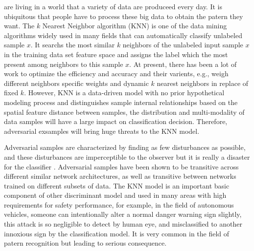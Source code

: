 \documentclass{ieeeaccess}
\begin{document}
\label{sec:introduction}
 are living in a world that a variety of data are produceed every day. It is ubiquitous that people have to process these big data to obtain the patern they want.
The $k$ Nearest Neighbor algorithm (KNN) is one of the data mining algorithms widely used in many fields that can automatically classify unlabeled sample $x$. It searchs the most similar $k$ neighbors of the unlabeled input sample $x$ in the training data set feature space and assigns the label which the most present among  neighbors to this sample $x$\cite{cover1967nearest}. 
At present, there has been a lot of work to optimize the efficiency and accuracy and their varients, e.g., weigh different neighbors specific weights\cite{bicego2016weighted} and dynamic $k$ nearest neighbors in replace of fixed $k$\cite{Zhong:2017:IKC:3055635.3056604}.
However, KNN is a data-driven model with no prior hypothetical modeling process and distinguishes sample internal relationships based on the spatial feature distance between samples, the distribution and multi-modality of data samples will have a large impact on classification decision. Therefore, adversarial exsamples will bring huge threats to the KNN model.

Adversarial samples are characterized by finding as few disturbances as possible, and these disturbances are imperceptible to the observer but it is really a disaster for the classifier \cite{goodfellow2014explaining}. Adversarial samples have been shown to be transitive across different similar network architectures, as well as transitive between networks trained on different subsets of data. The KNN model is an important basic component of other discriminant model and used in many areas with high requirements for safety performance, for example, in the field of autonomous vehicles, someone can intentionally alter a normal danger warning sign slightly, this attack is so negligible to detect by human eye, and misclassified to another innoxious sign by the classification model. It is very common in the field of patern recognition but leading to serious consequence.
\end{document}
